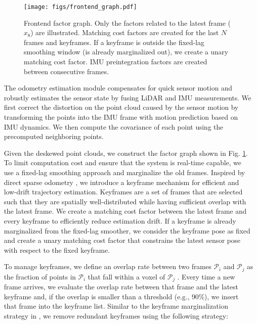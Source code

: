 \documentclass[letterpaper, 10 pt, conference]{ieeeconf}  %
\begin{document}
\begin{figure}[tb]
  \centering
  \texttt{[image: figs/frontend\_graph.pdf]}
  \caption{Frontend factor graph. Only the factors related to the latest frame ($x_8$) are illustrated. Matching cost factors are created for the last $N$ frames and keyframes. If a keyframe is outside the fixed-lag smoothing window (is already marginalized out), we create a unary matching cost factor. IMU preintegration factors are created between consecutive frames.}
  \label{fig:frontend_graph}
\end{figure}

The odometry estimation module compensates for quick sensor motion and robustly estimates the sensor state by fusing LiDAR and IMU measurements. We first correct the distortion on the point cloud caused by the sensor motion by transforming the points into the IMU frame with motion prediction based on IMU dynamics. We then compute the covariance of each point using the precomputed neighboring points.

Given the deskewed point clouds, we construct the factor graph shown in Fig. \ref{fig:frontend_graph}. To limit computation cost and ensure that the system is real-time capable, we use a fixed-lag smoothing approach and marginalize the old frames. Inspired by direct sparse odometry \cite{Engel2018}, we introduce a keyframe mechanism for efficient and low-drift trajectory estimation. Keyframes are a set of frames that are selected such that they are spatially well-distributed while having sufficient overlap with the latest frame. We create a matching cost factor between the latest frame and every keyframe to efficiently reduce estimation drift. If a keyframe is already marginalized from the fixed-lag smoother, we consider the keyframe pose as fixed and create a unary matching cost factor that constrains the latest sensor pose with respect to the fixed keyframe.

To manage keyframes, we define an overlap rate between two frames $\mathcal{P}_i$ and $\mathcal{P}_j$ as the fraction of points in $\mathcal{P}_i$ that fall within a voxel of $\mathcal{P}_j$ \cite{koide_ral2021}. Every time a new frame arrives, we evaluate the overlap rate between that frame and the latest keyframe and, if the overlap is smaller than a threshold (e.g., 90\%), we insert that frame into the keyframe list. Similar to the keyframe marginalization strategy in \cite{Engel2018}, we remove redundant keyframes using the following strategy:
\end{document}
